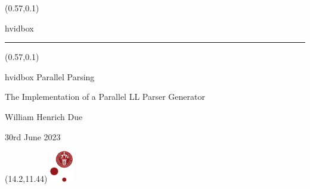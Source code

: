\documentclass[t,24pt]{beamer}
\begin{document}
{
\begin{frame}
    \begin{textblock*}{\textwidth}(0.57\textwidth,0.1\textheight)
        \begin{beamercolorbox}[wd=6.4cm,ht=7.7cm,sep=0.5cm]{hvidbox}
            \fontsize{4}{10}\selectfont {}
            \noindent\textcolor{KUrod}{\rule{5.4cm}{0.4pt}}
        \end{beamercolorbox}
    \end{textblock*}
    \begin{textblock*}{\textwidth}(0.57\textwidth,0.1\textheight)
        \begin{beamercolorbox}[wd=6.4cm,sep=0.5cm]{hvidbox}
            \Huge \textcolor{KUrod}{Parallel Parsing}
            \vspace{0.5cm}
            \par
            \Large The Implementation of a Parallel LL Parser Generator
            \vspace{0.5cm}
            \par
            \normalsize William Henrich Due
            \vspace{0.1cm}
            \par
            30rd June 2023
        \end{beamercolorbox}
    \end{textblock*}
    \begin{textblock}{1}(14.2,11.44)
        \includegraphics[width=1cm]{KU/KU-logo.png}
    \end{textblock}
\end{frame}
}
\end{document}
